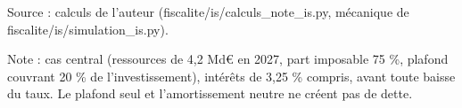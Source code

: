 Source : calculs de l'auteur (fiscalite/is/calculs\_note\_is.py, mécanique de fiscalite/is/simulation\_is.py).\par Note : cas central (ressources de 4,2 Md\euro{} en 2027, part imposable 75 \%, plafond couvrant 20 \% de l'investissement), intérêts de 3,25 \% compris, avant toute baisse du taux. Le plafond seul et l'amortissement neutre ne créent pas de dette.
